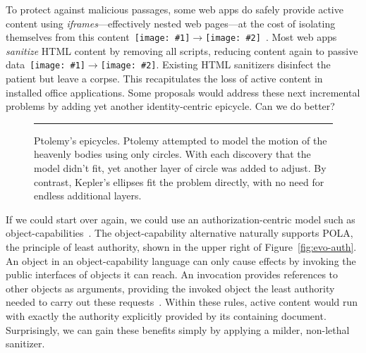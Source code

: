 \documentclass[letterpaper,twocolumn,10pt]{article}
\newcommand{\qq}[2]{{\texttt{[image: \#1]}}$\rightarrow${\texttt{[image: \#2]}}}
\begin{document}
To protect against malicious passages, some web apps do safely provide active 
content using \emph{iframes}---effectively nested web pages---at the cost of 
isolating themselves from this content~\qq{4}{3}~\cite{mashupos}. Most web 
apps \emph{sanitize} HTML content by removing all scripts, reducing content 
again to passive data~\qq{4}{1}. Existing HTML sanitizers disinfect the 
patient but leave a corpse. This recapitulates the loss of active content in 
installed office applications. Some proposals would address these next 
incremental problems by adding yet another identity-centric 
epicycle. Can we do better?

\begin{figure}[t!]

  \caption[Ptolemy's epicycles.]{Ptolemy's epicycles. Ptolemy attempted to
  model the motion of the heavenly bodies using only circles. With each
  discovery that the model didn't fit, yet another layer of circle was added
  to adjust. By contrast, Kepler's ellipses fit the problem directly, with no
  need for endless additional layers. 
  \\ } \hrule
  \label{fig:epicycle}
\end{figure}

If we could start over again, we could use an authorization-centric model 
such as object-capabilities~\cite{DVH}. The object-capability alternative 
naturally supports POLA, the principle of least authority, shown in the upper 
right of Figure~\ref{fig:evo-auth}. An object in an object-capability 
language can only cause effects by invoking the public interfaces of objects 
it can reach. An invocation provides references to other objects as 
arguments, providing the invoked object the least authority needed to carry 
out these requests~\cite{RobustComposition}. Within these rules, active 
content would run with exactly the authority explicitly provided by its 
containing document. Surprisingly, we can gain these benefits simply by 
applying a milder, non-lethal sanitizer.
\end{document}
